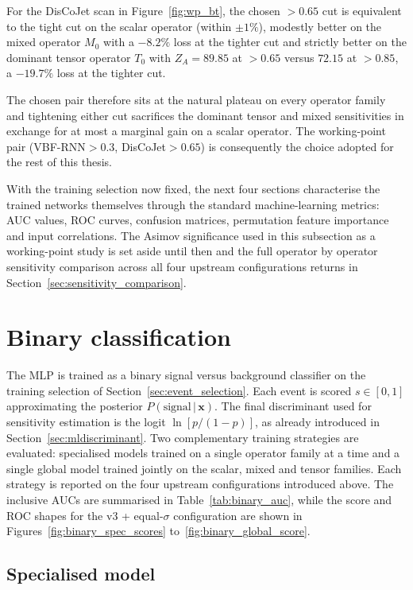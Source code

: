 For the DisCoJet scan in Figure~\ref{fig:wp_bt}, the chosen ${>}0.65$ cut is equivalent to the tight cut on the scalar operator (within $\pm 1\%$), modestly better on the mixed operator $M_0$ with a $-8.2\%$ loss at the tighter cut and strictly better on the dominant tensor operator $T_0$ with $Z_A=89.85$ at ${>}0.65$ versus $72.15$ at ${>}0.85$, a $-19.7\%$ loss at the tighter cut.

The chosen pair therefore sits at the natural plateau on every operator family and tightening either cut sacrifices the dominant tensor and mixed sensitivities in exchange for at most a marginal gain on a scalar operator. The working-point pair (VBF-RNN${}>0.3$, DisCoJet${}>0.65$) is consequently the choice adopted for the rest of this thesis.

With the training selection now fixed, the next four sections characterise the trained networks themselves through the standard machine-learning metrics: AUC values, ROC curves, confusion matrices, permutation feature importance and input correlations. The Asimov significance used in this subsection as a working-point study is set aside until then and the full operator by operator sensitivity comparison across all four upstream configurations returns in Section~\ref{sec:sensitivity_comparison}.

\section{Binary classification}
\label{sec:binary_classification}

The MLP is trained as a binary signal versus background classifier on the training selection of Section~\ref{sec:event_selection}. Each event is scored $s\in[0,1]$ approximating the posterior $P(\mathrm{signal}\,|\,\mathbf{x})$. The final discriminant used for sensitivity estimation is the logit $\ln[p/(1-p)]$, as already introduced in Section~\ref{sec:mldiscriminant}. Two complementary training strategies are evaluated: specialised models trained on a single operator family at a time and a single global model trained jointly on the scalar, mixed and tensor families. Each strategy is reported on the four upstream configurations introduced above. The inclusive AUCs are summarised in Table~\ref{tab:binary_auc}, while the score and ROC shapes for the v3 + equal-$\sigma$ configuration are shown in Figures~\ref{fig:binary_spec_scores} to~\ref{fig:binary_global_score}.

\subsection{Specialised model}
\label{sec:binary_specialised}

